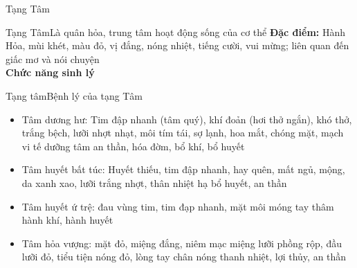 \documentclass[
	11pt, %
]{beamer}
\theoremstyle{newblock}
\begin{document}
\begin{frame}
	\Huge{Tạng Tâm}
\end{frame}

\begin{frame}{Tạng Tâm}{Là quân hỏa, trung tâm hoạt động sống của cơ thể}
{\bf Đặc điểm:} Hành Hỏa, mùi khét, màu đỏ, vị đắng, nóng nhiệt, tiếng cười, vui mừng; liên quan đến giấc mơ và nói chuyện\\
{\bf Chức năng sinh lý}\\
\begin{itemize}
\end{itemize}
\end{frame}

\begin{frame}{Tạng tâm}{Bệnh lý của tạng Tâm}
	\begin{itemize}
		\item Tâm dương hư: Tim đập nhanh (tâm quý), khí đoản (hơi thở ngắn), khó thở, trắng bệch, lưỡi nhợt nhạt, môi tím tái, sợ lạnh, hoa mắt, chóng mặt, mạch vi tế dưỡng tâm an thần, hóa đờm, bổ khí, bổ huyết
		\item Tâm huyết bất túc: Huyết thiếu, tim đập nhanh, hay quên, mất ngủ, mộng, da xanh xao, lưỡi trắng nhợt, thân nhiệt hạ  bổ huyết, an thần
		\item Tâm huyết ứ trệ: đau vùng tim, tim đạp nhanh, mặt môi móng tay thâm    hành khí, hành huyết
		\item Tâm hỏa vượng: mặt đỏ, miệng đắng, niêm mạc miệng lưỡi phồng rộp, đầu lưỡi đỏ, tiểu tiện nóng đỏ, lòng tay chân nóng  thanh nhiệt, lợi thủy, an thần
	\end{itemize}
\end{frame}
\end{document}
